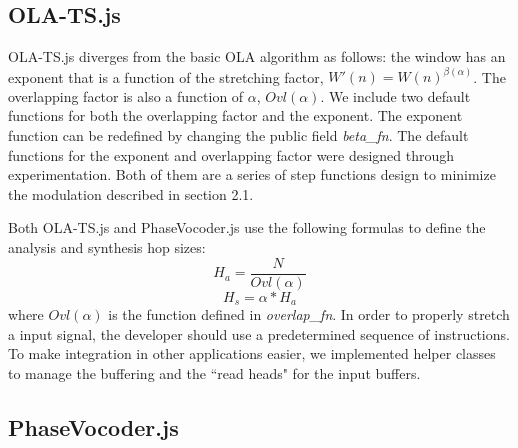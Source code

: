 \documentclass{sig-alternate}
\begin{document}
\begin{sloppypar}
\subsection{OLA-TS.js}

OLA-TS.js diverges from the basic OLA algorithm as follows: the window has an exponent that is a function of the stretching factor, $W'(n) = W(n)^{\beta(\alpha)}$. The overlapping factor is also a function of $\alpha$, $Ovl(\alpha)$. We include two default functions for both the overlapping factor and the exponent. The exponent function can be redefined by changing the public field \textit{beta\_fn}. The default functions for the exponent and overlapping factor were designed through experimentation. Both of them are a series of step functions design to minimize the modulation described in section 2.1.

Both OLA-TS.js and PhaseVocoder.js use the following formulas to define the analysis and synthesis hop sizes:
\begin{equation}
	H_a = \frac{N}{Ovl(\alpha)}
\end{equation}
\begin{equation}
	H_s = \alpha * H_a
\end{equation}
%
where $Ovl(\alpha)$ is the function defined in \textit{overlap\_fn}. In order to properly stretch a input signal, the developer should use a predetermined sequence of instructions. To make integration in other applications easier, we implemented helper classes to manage the buffering and the ``read heads" for the input buffers. 

\subsection{PhaseVocoder.js}


\end{sloppypar}
\end{document}

